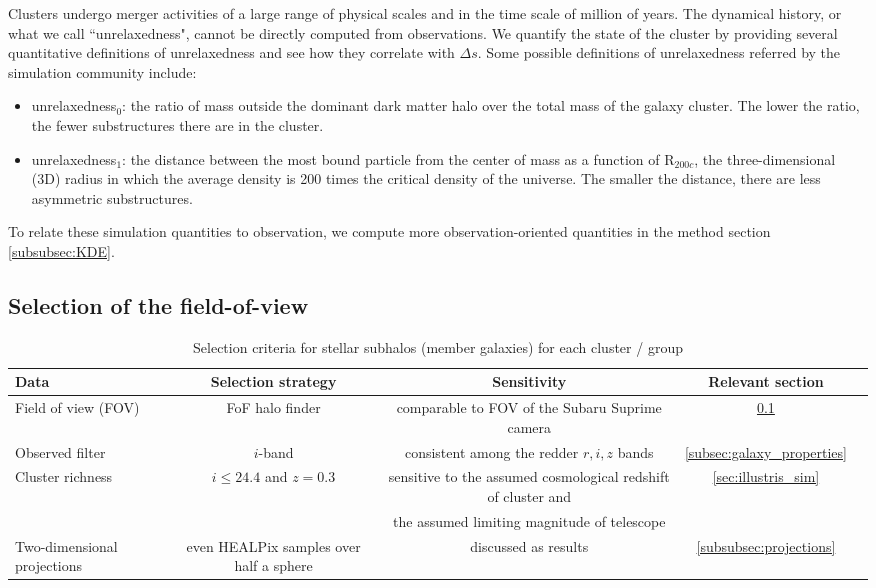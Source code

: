 Clusters undergo merger activities of a large range of physical scales and 
in the time scale of million of years. 
The dynamical history, or what we call ``unrelaxedness", cannot be directly 
computed from observations.
We quantify the state of the cluster by providing several quantitative
definitions of unrelaxedness and see how they correlate with $\Delta s$.
Some possible definitions of unrelaxedness referred by the simulation community
include:
\begin{itemize}
	\item unrelaxedness$_0$: the ratio of mass outside the dominant dark matter halo over the total mass
		of the galaxy cluster. The lower the ratio, the fewer substructures there
		are in the cluster. 
	\item unrelaxedness$_1$: the distance between the most bound particle from the center of mass as a
		function of R$_{200c}$, the three-dimensional (3D) radius in which the
		average density is 200 times the critical density of the universe. 
		The smaller the distance, there are less asymmetric 
		substructures. 
\end{itemize}
To relate these simulation quantities to observation, 
we compute more observation-oriented 
quantities in the method section \ref{subsubsec:KDE}. 

\subsection{Selection of the field-of-view}
\label{sec:FOV}

\begin{table*}
\begin{center}
	\begin{minipage}{180mm} 
	\caption{ Selection criteria for stellar subhalos (member galaxies) for each
		cluster / group 
\label{tab:member_galaxy_selections}} 
	\begin{tabular}{@{}lcccc@{}}
\hline 
Data &  Selection strategy  & Sensitivity & Relevant section  \\ \hline
Field of view (FOV) & FoF halo finder& comparable to FOV of the Subaru
Suprime camera & \ref{sec:FOV}  \\ 
Observed filter & $i$-band & consistent among the redder $r, i, z$ bands &   
\ref{subsec:galaxy_properties}
\\ 
Cluster richness  & $i \leq 24.4$ and $z = 0.3$  & sensitive to
the assumed cosmological redshift of cluster and & \ref{sec:illustris_sim} \\ 
& & the assumed limiting magnitude of telescope &   \\
Two-dimensional projections & even HEALPix samples over half a sphere &
discussed as results  & \ref{subsubsec:projections}\\  
\hline
\end{tabular} 
\footnotesize{
}
\end{minipage}
\end{center} 
\end{table*}

